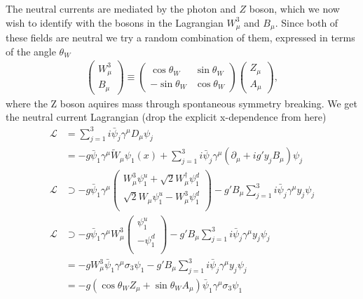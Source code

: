 \documentclass[11pt]{article}
\begin{document}
\begin{multicols}{2}
\begin{flushleft}
The neutral currents are mediated by the photon and $Z$ boson, which we now wish to identify with the bosons in the Lagrangian $W_{\mu}^3$ and $B_{\mu}$. Since both of these fields are neutral we try a random combination of them, expressed in terms of the angle $\theta_W$
\begin{align*}
\begin{pmatrix}
W_{\mu}^3\\
B_{\mu}
\end{pmatrix}
\equiv \begin{pmatrix}
\cos \theta_W & \sin \theta_W\\
- \sin \theta_W & \cos \theta_W
\end{pmatrix}
\begin{pmatrix}
Z_{\mu}\\
A_{\mu}
\end{pmatrix},
\end{align*}
where the Z boson aquires mass through spontaneous symmetry breaking. We get the neutral current Lagrangian (drop the explicit x-dependence from here)
\begin{align*}
\mathcal{L} &= \sum_{j=1}^3 i \bar{\psi}_j  \gamma^{\mu} D_{\mu} \psi_j\\
&= - g\bar{\psi}_1 \gamma^{\mu} \tilde{W}_{\mu} \psi_1(x) 
+ \sum_{j=1}^3 i\bar{\psi}_j \gamma^{\mu}(\partial_{\mu} + ig' y_jB_{\mu}) \psi_j\\
\mathcal{L} & \supset - g\bar{\psi}_1 \gamma^{\mu} \begin{pmatrix}
W_{\mu}^3 \psi_1^u + \sqrt{2} W_{\mu}^{\dagger} \psi_1^d\\
\sqrt{2} W_{\mu} \psi_1^u - W_{\mu}^3 \psi_1^d\\
\end{pmatrix}  
-g' B_{\mu} \sum_{j=1}^3 i\bar{\psi}_j \gamma^{\mu} y_j \psi_j\\
\mathcal{L} & \supset  - g\bar{\psi}_1 \gamma^{\mu} 
W_{\mu}^3 
\begin{pmatrix}
\psi_1^u \\
- \psi_1^d\\
\end{pmatrix}
-g' B_{\mu} \sum_{j=1}^3 i\bar{\psi}_j \gamma^{\mu} y_j \psi_j\\
&= - g W_{\mu}^3 \bar{\psi}_1 \gamma^{\mu} 
 \sigma_3 \psi_1
-g' B_{\mu} \sum_{j=1}^3 i\bar{\psi}_j \gamma^{\mu} y_j \psi_j\\
&= - g (\cos \theta_W Z_{\mu} + \sin \theta_W A_{\mu}) \bar{\psi}_1 \gamma^{\mu} 
 \sigma_3 \psi_1\\

\end{align*}
\end{flushleft}
\end{multicols}
\end{document}
